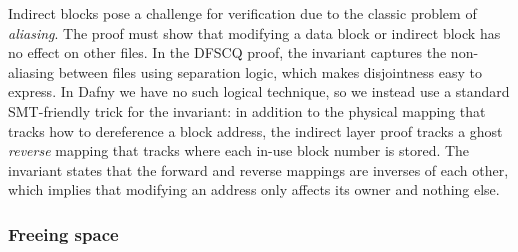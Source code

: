 
Indirect blocks pose a challenge for verification due to the classic problem of
\emph{aliasing}. The proof must show that modifying a data block or indirect
block has no effect on other files. In the DFSCQ proof, the invariant
captures the non-aliasing between files using separation logic, which makes
disjointness easy to express. In Dafny we have no such logical
technique, so we instead use a standard SMT-friendly trick for the invariant: in
addition to the physical mapping that tracks how to dereference a block address,
the indirect layer proof tracks a ghost \emph{reverse} mapping that tracks where
each in-use block number is stored. The invariant states that the forward and reverse
mappings are inverses of each other, which implies that modifying an address
only affects its owner and nothing else.



\subsubsection{Freeing space}
\label{sec:dafny:freeing}

